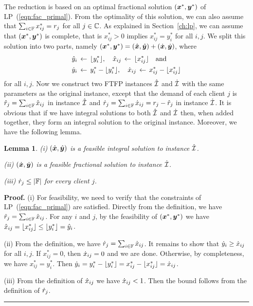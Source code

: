 \documentclass[oneside,final]{ucr}
\newtheorem{lemma}[theorem]{Lemma}
\newenvironment{proof}[1][Proof]{\textbf{#1.} }{\ \rule{0.5em}{0.5em}}
\begin{document}
The reduction is based on an optimal fractional solution
$(\boldsymbol{x}^\ast,\boldsymbol{y}^\ast)$ of LP~(\ref{eqn:fac_primal}). From
the optimality of this solution, we can also assume that
$\sum_{i\in\mathbb{F}} x^\ast_{ij} = r_j$ for all
$j\in\mathbb{C}$.  As explained in Section~\ref{ch:lp}, we
can assume that $(\boldsymbol{x}^\ast,\boldsymbol{y}^\ast)$ is complete, that is
$x^\ast_{ij} > 0$ implies $x^\ast_{ij} = y^\ast_i$ for all
$i,j$.  We split this solution into two parts, namely
$(\boldsymbol{x}^\ast,\boldsymbol{y}^\ast) = (\hat{\boldsymbol{x}},\hat{\boldsymbol{y}})+
(\dot{\boldsymbol{x}},\dot{\boldsymbol{y}})$, where
%
\begin{align*}
{\hat y}_i &\;{\,\leftarrow\,}\; { \lfloor y_i^\ast \rfloor }, \quad
			{\hat x}_{ij} \;{\,\leftarrow\,}\; { \lfloor x_{ij}^\ast \rfloor } \quad\textrm{and}
			\\
{\dot y}_i &\;{\,\leftarrow\,}\; y_i^\ast - { \lfloor y_i^\ast \rfloor }, \quad
 	{\dot x}_{ij} \;{\,\leftarrow\,}\; x_{ij}^\ast -  { \lfloor x_{ij}^\ast \rfloor }
\end{align*}
%
for all $i,j$. Now we construct two
FTFP instances $\hatcalI$ and $\dotcalI$ with the same
parameters as the original instance, except that the demand of each client $j$ is
${\hat r}_j = \sum_{i\in\mathbb{F}} {\hat x}_{ij}$ in instance $\hatcalI$ and
${\dot r}_j = \sum_{i\in\mathbb{F}} {\dot x}_{ij} = r_j - {\hat r}_j$ in instance $\dotcalI$. 
It is obvious that if we have integral solutions to both $\hatcalI$
and $\dotcalI$ then, when added together, they form an integral
solution to the original instance.  Moreover, we have the
following lemma.


\begin{lemma}\label{lem: polynomial demands partition}
{\rm (i)}
  $(\hat{\boldsymbol{x}}, \hat{\boldsymbol{y}})$ is a feasible integral solution to
  instance $\hatcalI$.

\noindent
{\rm (ii)}
  $(\dot{\boldsymbol{x}}, \dot{\boldsymbol{y}})$ is a feasible fractional
  solution to instance $\dotcalI$.

\noindent
{\rm (iii)}
${\dot r}_j\leq |\mathbb{F}|$ for every client $j$.

\end{lemma}

\begin{proof}
(i) For feasibility, we need to verify that the constraints of LP~(\ref{eqn:fac_primal})
are satisfied. Directly from the definition, we have ${\hat r}_j = \sum_{i\in\mathbb{F}} {\hat x}_{ij}$.
For any $i$ and $j$, by the feasibility of $(\boldsymbol{x}^\ast,\boldsymbol{y}^\ast)$ we have
${\hat x}_{ij} = { \lfloor x_{ij}^\ast \rfloor } \le { \lfloor y^\ast_i \rfloor } = {\hat y}_i$.

(ii) From the definition, we have  ${\dot r}_j = \sum_{i\in\mathbb{F}} {\dot x}_{ij}$.
It remains to show that ${\dot y}_i \geq {\dot x}_{ij}$ for all $i,j$. 
If $x_{ij}^\ast=0$, then ${\dot x}_{ij}=0$ and we are done. 
Otherwise, by completeness, we have $x_{ij}^\ast=y_i^\ast$. 
Then  ${\dot y}_i = y_i^\ast - { \lfloor y_i^\ast \rfloor } = x_{ij}^\ast - { \lfloor x_{ij}^\ast \rfloor } ={\dot x}_{ij}$. 

(iii) From the definition of ${\dot x}_{ij}$ we have
  ${\dot x}_{ij} < 1$.  Then the bound follows from the definition of ${\dot r}_j$.
\end{proof}
\end{document}
